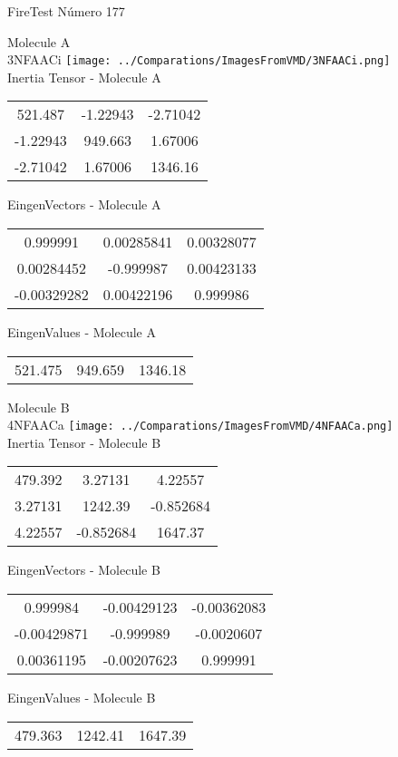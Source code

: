\vtab[-2cm]
\begin{center}
{\large FireTest \tab Número 177}
\end{center}
\begin{multicols}{2}
\begin{center}

Molecule A \\ 
3NFAACi
\texttt{[image: ../Comparations/ImagesFromVMD/3NFAACi.png]}
\\
Inertia Tensor - Molecule A \\
\vtab

\begin{tabular}{|c c c|}
521.487	 & 	-1.22943	 & 	-2.71042	 \\
-1.22943	 & 	949.663	 & 	1.67006	 \\
-2.71042	 & 	1.67006	 & 	1346.16
\end{tabular}

\vtab
 EingenVectors - Molecule A     \\
\vtab
\begin{tabular}{|c c c|}
0.999991	 & 	0.00285841	 & 	0.00328077	 \\
0.00284452	 & 	-0.999987	 & 	0.00423133	 \\
-0.00329282	 & 	0.00422196	 & 	0.999986
\end{tabular}

\vtab
 EingenValues - Molecule A     \\
\vtab
\begin{tabular}{|c c c|}
521.475	 & 	949.659	 & 	1346.18	 \\
\end{tabular}
\columnbreak

Molecule B \\ 
4NFAACa
\texttt{[image: ../Comparations/ImagesFromVMD/4NFAACa.png]}
\\
Inertia Tensor - Molecule B \\
\vtab

\begin{tabular}{|c c c|}
479.392	 & 	3.27131	 & 	4.22557	 \\
3.27131	 & 	1242.39	 & 	-0.852684	 \\
4.22557	 & 	-0.852684	 & 	1647.37
\end{tabular}

\vtab
 EingenVectors - Molecule B     \\
\vtab
\begin{tabular}{|c c c|}
0.999984	 & 	-0.00429123	 & 	-0.00362083	 \\
-0.00429871	 & 	-0.999989	 & 	-0.0020607	 \\
0.00361195	 & 	-0.00207623	 & 	0.999991
\end{tabular}

\vtab
 EingenValues - Molecule B     \\
\vtab
\begin{tabular}{|c c c|}
479.363	 & 	1242.41	 & 	1647.39	 \\
\end{tabular}

\end{center}
\end{multicols}
